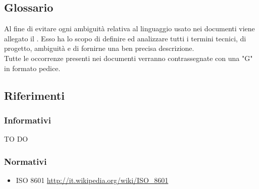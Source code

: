 \subsection{Glossario}
Al fine di evitare ogni ambiguità relativa al linguaggio usato nei documenti viene allegato il \docNameVersionGlo.
Esso ha lo scopo di definire ed analizzare tutti i termini tecnici, di progetto, ambiguità e di fornirne una ben precisa descrizione.\\
Tutte le occorrenze presenti nei documenti verranno contrassegnate con una "G" in formato pedice.\\


\subsection{Riferimenti}

\subsubsection{Informativi}
TO DO
\subsubsection{Normativi}
\begin{itemize}
\item ISO 8601 \url{http://it.wikipedia.org/wiki/ISO_8601}
\end{itemize}
